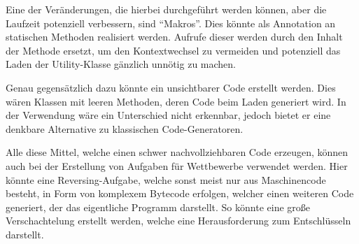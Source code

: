 Eine der Veränderungen, die hierbei durchgeführt werden können, aber die Laufzeit potenziell verbessern, sind "`Makros"'. Dies könnte als Annotation an statischen Methoden realisiert werden. Aufrufe dieser werden durch den Inhalt der Methode ersetzt, um den Kontextwechsel zu vermeiden und potenziell das Laden der Utility-Klasse gänzlich unnötig zu machen.

Genau gegensätzlich dazu könnte ein unsichtbarer Code erstellt werden. Dies wären Klassen mit leeren Methoden, deren Code beim Laden generiert wird. In der Verwendung wäre ein Unterschied nicht erkennbar, jedoch bietet er eine denkbare Alternative zu klassischen Code-Generatoren.

Alle diese Mittel, welche einen schwer nachvollziehbaren Code erzeugen, können auch bei der Erstellung von Aufgaben für Wettbewerbe verwendet werden. Hier könnte eine Reversing-Aufgabe, welche sonst meist nur aus Maschinencode besteht, in Form von komplexem Bytecode erfolgen, welcher einen weiteren Code generiert, der das eigentliche Programm darstellt. So könnte eine große Verschachtelung erstellt werden, welche eine Herausforderung zum Entschlüsseln darstellt.